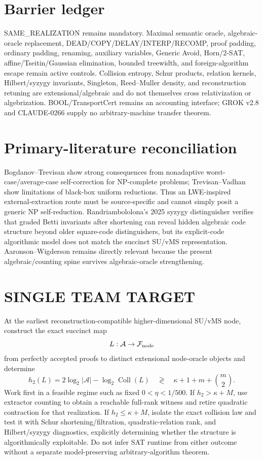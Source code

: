 \documentclass[11pt]{article}
\begin{document}
\section*{Barrier ledger}
SAME_REALIZATION remains mandatory. Maximal semantic oracle, algebraic-oracle replacement, DEAD/COPY/DELAY/INTERP/RECOMP, proof padding, ordinary padding, renaming, auxiliary variables, Generic Avoid, Horn/2-SAT, affine/Tseitin/Gaussian elimination, bounded treewidth, and foreign-algorithm escape remain active controls. Collision entropy, Schur products, relation kernels, Hilbert/syzygy invariants, Singleton, Reed--Muller density, and reconstruction retuning are extensional/algebraic and do not themselves cross relativization or algebrization. BOOL/TransportCert remains an accounting interface; GROK v2.8 and CLAUDE-0266 supply no arbitrary-machine transfer theorem.

\section*{Primary-literature reconciliation}
Bogdanov--Trevisan show strong consequences from nonadaptive worst-case/average-case self-correction for NP-complete problems; Trevisan--Vadhan show limitations of black-box uniform reductions. Thus an LWE-inspired external-extraction route must be source-specific and cannot simply posit a generic NP self-reduction. Randriambololona's 2025 syzygy distinguisher verifies that graded Betti invariants after shortening can reveal hidden algebraic code structure beyond older square-code distinguishers, but its explicit-code algorithmic model does not match the succinct SU/vMS representation. Aaronson--Wigderson remains directly relevant because the present algebraic/counting spine survives algebraic-oracle strengthening.

\section*{SINGLE TEAM TARGET}
At the earliest reconstruction-compatible higher-dimensional SU/vMS node, construct the exact succinct map
\[
L:\mathcal A\to\mathcal F_{\rm node}
\]
from perfectly accepted proofs to distinct extensional node-oracle objects and determine
\[
\boxed{h_2(L)=2\log_2|\mathcal A|-\log_2\operatorname{Coll}(L)}
\quad\mathop{\gtrless}\quad
\boxed{\kappa+1+m+\binom m2}.
\]
Work first in a feasible regime such as fixed \(0<\eta<1/500\). If \(h_2>\kappa+M\), use extractor counting to obtain a reachable full-rank witness and retire quadratic contraction for that realization. If \(h_2\le\kappa+M\), isolate the exact collision law and test it with Schur shortening/filtration, quadratic-relation rank, and Hilbert/syzygy diagnostics, explicitly determining whether the structure is algorithmically exploitable. Do not infer SAT runtime from either outcome without a separate model-preserving arbitrary-algorithm theorem.
\end{document}
